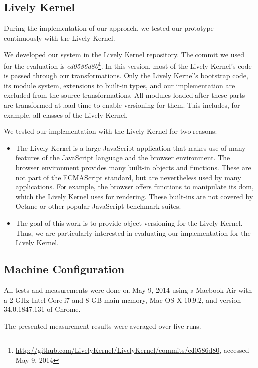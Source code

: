 \subsection{Lively Kernel}

During the implementation of our approach, we tested our prototype continuously with the Lively Kernel.

We developed our system in the Lively Kernel repository.
The commit we used for the evaluation is \emph{ed0586d80}\footnote{\url{http://github.com/LivelyKernel/LivelyKernel/commits/ed0586d80}, accessed May 9, 2014}. In this version, most of the Lively Kernel's code is passed through our transformations.
Only the Lively Kernel's bootstrap code, its module system, extensions to built-in types, and our implementation are excluded from the source transformations.
All modules loaded after these parts are transformed at load-time to enable versioning for them.
This includes, for example, all classes of the Lively Kernel.

We tested our implementation with the Lively Kernel for two reasons:

\begin{itemize}
    \item The Lively Kernel is a large JavaScript application that makes use of many features of the JavaScript language and the browser environment. The browser environment provides many built-in objects and functions. These are not part of the ECMAScript standard, but are nevertheless used by many applications. For example, the browser offers functions to manipulate its \ac{dom}, which the Lively Kernel uses for rendering. These built-ins are not covered by Octane or other popular JavaScript benchmark suites. 
    \item The goal of this work is to provide object versioning for the Lively Kernel. Thus, we are particularly interested in evaluating our implementation for the Lively Kernel.
\end{itemize}


\subsection{Machine Configuration}

All tests and measurements were done on May 9, 2014 using a Macbook Air with a 2 GHz Intel Core i7 and 8 GB main memory, Mac OS X 10.9.2, and version 34.0.1847.131 of Chrome.

The presented measurement results were averaged over five runs.

